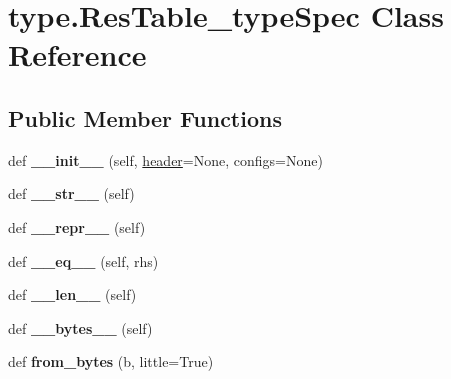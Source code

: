 \hypertarget{classtype_1_1ResTable__typeSpec}{}\section{type.\+Res\+Table\+\_\+type\+Spec Class Reference}
\label{classtype_1_1ResTable__typeSpec}
\subsection*{Public Member Functions}
\begin{DoxyCompactItemize}
\item 
\mbox{\label{classtype_1_1ResTable__typeSpec_aa101106c2a979f1eb227cf8ce8c72c00}} 
def {\bfseries \+\_\+\+\_\+init\+\_\+\+\_\+} (self, \mbox{\hyperlink{classtype_1_1ResTable__typeSpec_a8a884ae739ae7024e8538644315297cb}{header}}=None, configs=None)
\item 
\mbox{\label{classtype_1_1ResTable__typeSpec_a742331e2640be10daab38503a035dfb5}} 
def {\bfseries \+\_\+\+\_\+str\+\_\+\+\_\+} (self)
\item 
\mbox{\label{classtype_1_1ResTable__typeSpec_a7f91794c107449f1ae51feda32c3c0b8}} 
def {\bfseries \+\_\+\+\_\+repr\+\_\+\+\_\+} (self)
\item 
\mbox{\label{classtype_1_1ResTable__typeSpec_af5ab92a5dc1efed5feb88df184fe47ca}} 
def {\bfseries \+\_\+\+\_\+eq\+\_\+\+\_\+} (self, rhs)
\item 
\mbox{\label{classtype_1_1ResTable__typeSpec_a98927ebab05811773be09ad5efcb365a}} 
def {\bfseries \+\_\+\+\_\+len\+\_\+\+\_\+} (self)
\item 
\mbox{\label{classtype_1_1ResTable__typeSpec_a8ea169dcb88e776674567cb72acf2d10}} 
def {\bfseries \+\_\+\+\_\+bytes\+\_\+\+\_\+} (self)
\item 
\mbox{\label{classtype_1_1ResTable__typeSpec_a01e88508871d07a3dc598e7491db3855}} 
def {\bfseries from\+\_\+bytes} (b, little=True)
\end{DoxyCompactItemize}
